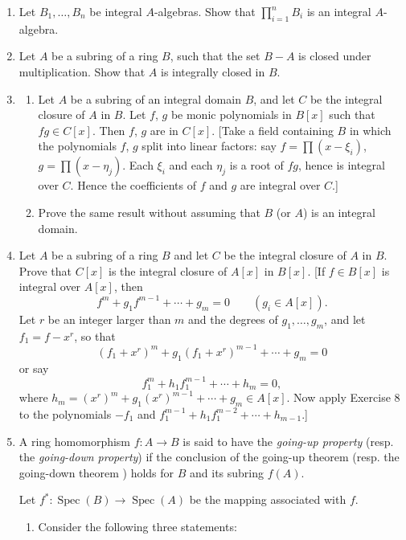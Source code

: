 \begin{enumerate}
\item Let $B_1,\ldots,B_n$ be integral $A$-algebras. Show that $\prod_{i=1}^nB_i$ is an integral $A$-algebra.

\item Let $A$ be a subring of a ring $B$, such that the set $B-A$ is closed under multiplication. Show that $A$ is integrally closed in $B$.

\item
\begin{enumerate}
\renewcommand{\labelenumii}{\roman{enumii})}
\item Let $A$ be a subring of an integral domain $B$, and let $C$ be the integral closure of $A$ in $B$. Let $f$, $g$ be monic polynomials in $B[x]$ such that $fg\in C[x]$. Then $f$, $g$ are in $C[x]$. [Take a field containing $B$ in which the polynomials $f$, $g$ split into linear factors: say $f=\prod(x-\xi_i)$, $g=\prod(x-\eta_j)$. Each $\xi_i$ and each $\eta_j$ is a root of $fg$, hence is integral over $C$. Hence the coefficients of $f$ and $g$ are integral over $C$.]
\item Prove the same result without assuming that $B$ (or $A$) is an integral domain.
\end{enumerate}

\item Let $A$ be a subring of a ring $B$ and let $C$ be the integral closure of $A$ in $B$. Prove that $C[x]$ is the integral closure of $A[x]$ in $B[x]$. [If $f\in B[x]$ is integral over $A[x]$, then
\[
 f^m+g_1f^{m-1}+\cdots+g_m=0\qquad(g_i\in A[x]).
\]
Let $r$ be an integer larger than $m$ and the degrees of $g_1,\ldots,g_m$, and let $f_1=f-x^r$, so that
\[
 (f_1+x^r)^m+g_1(f_1+x^r)^{m-1}+\cdots+g_m=0
\]
or say
\[
 f_1^m+h_1f_1^{m-1}+\cdots+h_m=0,
\]
where $h_m=(x^r)^m+g_1(x^r)^{m-1}+\cdots+g_m\in A[x]$. Now apply Exercise 8 to the polynomials $-f_1$ and $f_1^{m-1}+h_1f_1^{m-2}+\cdots+h_{m-1}$.]

\item A ring homomorphism $f:A\longrightarrow B$ is said to have the \textit{going-up property} (resp. the \textit{going-down property}) if the conclusion of the going-up theorem  (resp. the going-down theorem ) holds for $B$ and its subring $f(A)$.

Let $f^*:\operatorname{Spec}(B)\longrightarrow\operatorname{Spec}(A)$ be the mapping associated with $f$.
\begin{enumerate}
\renewcommand{\labelenumii}{\roman{enumii})}
\item Consider the following three statements:


\end{enumerate}
\end{enumerate}
